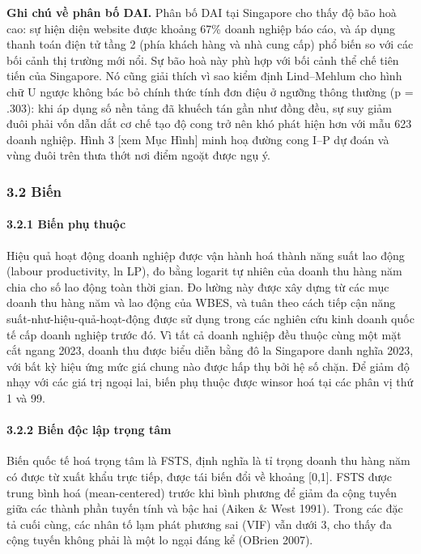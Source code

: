 \documentclass[12pt,a4paper]{article}
\begin{document}
\textbf{Ghi chú về phân bố DAI.} Phân bố DAI tại Singapore cho thấy độ
bão hoà cao: sự hiện diện website được khoảng 67\% doanh nghiệp báo cáo,
và áp dụng thanh toán điện tử tầng 2 (phía khách hàng và nhà cung cấp)
phổ biến so với các bối cảnh thị trường mới nổi. Sự bão hoà này phù hợp
với bối cảnh thể chế tiên tiến của Singapore. Nó cũng giải thích vì sao
kiểm định Lind--Mehlum cho hình chữ U ngược không bác bỏ chính thức tính
đơn điệu ở ngưỡng thông thường (p = .303): khi áp dụng số nền tảng đã
khuếch tán gần như đồng đều, sự suy giảm đuôi phải vốn dẫn dắt cơ chế
tạo độ cong trở nên khó phát hiện hơn với mẫu 623 doanh nghiệp. Hình 3
{[}xem Mục Hình{]} minh hoạ đường cong I--P dự đoán và vùng đuôi trên
thưa thớt nơi điểm ngoặt được ngụ ý.

\hypertarget{32-biux1ebfn}{%
\subsubsection{3.2 Biến}\label{32-biux1ebfn}}

\hypertarget{321-biux1ebfn-phux1ee5-thuux1ed9c}{%
\paragraph{3.2.1 Biến phụ
thuộc}\label{321-biux1ebfn-phux1ee5-thuux1ed9c}}

Hiệu quả hoạt động doanh nghiệp được vận hành hoá thành năng suất lao
động (labour productivity, ln LP), đo bằng logarit tự nhiên của doanh
thu hàng năm chia cho số lao động toàn thời gian. Đo lường này được xây
dựng từ các mục doanh thu hàng năm và lao động của WBES, và tuân theo
cách tiếp cận năng suất-như-hiệu-quả-hoạt-động được sử dụng trong các
nghiên cứu kinh doanh quốc tế cấp doanh nghiệp trước đó. Vì tất cả doanh
nghiệp đều thuộc cùng một mặt cắt ngang 2023, doanh thu được biểu diễn
bằng đô la Singapore danh nghĩa 2023, với bất kỳ hiệu ứng mức giá chung
nào được hấp thụ bởi hệ số chặn. Để giảm độ nhạy với các giá trị ngoại
lai, biến phụ thuộc được winsor hoá tại các phân vị thứ 1 và 99.

\hypertarget{322-biux1ebfn-ux111ux1ed9c-lux1eadp-trux1ecdng-tuxe2m}{%
\paragraph{3.2.2 Biến độc lập trọng
tâm}\label{322-biux1ebfn-ux111ux1ed9c-lux1eadp-trux1ecdng-tuxe2m}}

Biến quốc tế hoá trọng tâm là FSTS, định nghĩa là tỉ trọng doanh thu
hàng năm có được từ xuất khẩu trực tiếp, được tái biến đổi về khoảng
{[}0,1{]}. FSTS được trung bình hoá (mean-centered) trước khi bình
phương để giảm đa cộng tuyến giữa các thành phần tuyến tính và bậc hai
(Aiken \& West 1991). Trong các đặc tả cuối cùng, các nhân tố lạm phát
phương sai (VIF) vẫn dưới 3, cho thấy đa cộng tuyến không phải là một lo
ngại đáng kể (O\textquotesingle Brien 2007).
\end{document}
